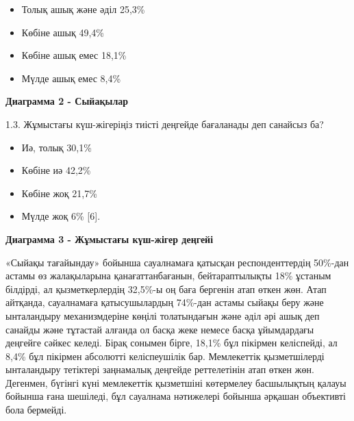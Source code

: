 \begin{itemize}
\item
  Толық ашық және әділ 25,3\%
\item
  Көбіне ашық 49,4\%
\item
  Көбіне ашық емес 18,1\%
\item
  Мүлде ашық емес 8,4\%
\end{itemize}

{\bfseries Диаграмма 2 - Сыйақылар}

1.3. Жұмыстағы күш-жігеріңіз тиісті деңгейде бағаланады деп санайсыз ба?

\begin{itemize}
\item
  Иә, толық 30,1\%
\item
  Көбіне иә 42,2\%
\item
  Көбіне жоқ 21,7\%
\item
  Мүлде жоқ 6\% {[}6{]}.
\end{itemize}

{\bfseries Диаграмма 3 - Жұмыстағы күш-жігер деңгейі}

«Сыйақы тағайындау» бойынша сауалнамаға қатысқан респонденттердің
50\%-дан астамы өз жалақыларына қанағаттанбағанын, бейтараптылықты 18\%
ұстаным білдірді, ал қызметкерлердің 32,5\%-ы оң баға бергенін атап
өткен жөн. Атап айтқанда, сауалнамаға қатысушылардың 74\%-дан астамы
сыйақы беру және ынталандыру механизмдеріне көңілі толатындағын және
әділ әрі ашық деп санайды және тұтастай алғанда ол басқа жеке немесе
басқа ұйымдардағы деңгейге сәйкес келеді. Бірақ сонымен бірге, 18,1\%
бұл пікірмен келіспейді, ал 8,4\% бұл пікірмен абсолютті келіспеушілік
бар. Мемлекеттік қызметшілерді ынталандыру тетіктері заңнамалық деңгейде
реттелетінін атап өткен жөн. Дегенмен, бүгінгі күні мемлекеттік
қызметшіні көтермелеу басшылықтың қалауы бойынша ғана шешіледі, бұл
сауалнама нәтижелері бойынша әрқашан объективті бола бермейді.

